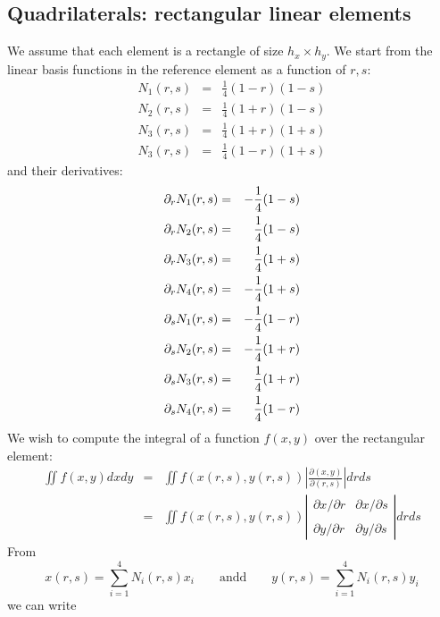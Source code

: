 \subsection{Quadrilaterals: rectangular linear elements} \label{app:qrle}

We assume that each element is a rectangle of size $h_x \times h_y$. 
We start from the linear basis functions in the reference element as a function of $r,s$:
\begin{eqnarray}
N_1(r,s) &=& \frac{1}{4}(1-r)(1-s) \\ 
N_2(r,s) &=& \frac{1}{4}(1+r)(1-s) \\ 
N_3(r,s) &=& \frac{1}{4}(1+r)(1+s) \\ 
N_3(r,s) &=& \frac{1}{4}(1-r)(1+s) 
\end{eqnarray}
and their derivatives:
\begin{eqnarray}
\partial_r N_1(r,s) &=& -\frac{1}{4}(1-s) \nonumber\\
\partial_r N_2(r,s) &=& \frac{1}{4}(1-s) \nonumber\\
\partial_r N_3(r,s) &=& \frac{1}{4}(1+s) \nonumber\\
\partial_r N_4(r,s) &=& -\frac{1}{4}(1+s) \nonumber\\
\partial_s N_1(r,s) &=& -\frac{1}{4}(1-r) \nonumber\\
\partial_s N_2(r,s) &=& -\frac{1}{4}(1+r) \nonumber\\
\partial_s N_3(r,s) &=& \frac{1}{4}(1+r) \nonumber\\
\partial_s N_4(r,s) &=& \frac{1}{4}(1-r) \nonumber
\end{eqnarray}
We wish to compute the integral of a function $f(x,y)$ over the rectangular element:
\begin{eqnarray}
\iint f(x,y) dx dy 
&=& \iint f(x(r,s),y(r,s)) \left| \frac{\partial (x,y)}{\partial (r,s) } \right|  dr ds \\
&=& \iint f(x(r,s),y(r,s)) 
\left| 
\begin{array}{cc}
\partial x/\partial r & \partial x/\partial s \\ \\
\partial y/\partial r & \partial y/\partial s 
\end{array}
\right|  dr ds 
\end{eqnarray}
From 
\[
x(r,s)=\sum_{i=1}^4 N_i(r,s) x_i 
\qquad \text{andd} \qquad 
y(r,s)=\sum_{i=1}^4 N_i(r,s) y_i 
\]
we can write
